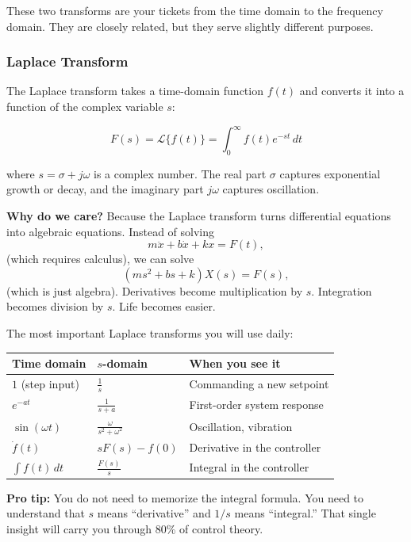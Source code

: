 These two transforms are your tickets from the time domain to the frequency domain. They are closely related, but they serve slightly different purposes.

\subsubsection{Laplace Transform}

The Laplace transform takes a time-domain function $f(t)$ and converts it into a function of the complex variable $s$:

\begin{equation}
F(s) = \mathcal{L}\{f(t)\} = \int_0^{\infty} f(t) e^{-st} \, dt
\end{equation}

where $s = \sigma + j\omega$ is a complex number. The real part $\sigma$ captures exponential growth or decay, and the imaginary part $j\omega$ captures oscillation.

\textbf{Why do we care?} Because the Laplace transform turns differential equations into algebraic equations. Instead of solving
\[
m\ddot{x} + b\dot{x} + kx = F(t),
\]
(which requires calculus), we can solve
\[
(ms^2 + bs + k)X(s) = F(s),
\]
(which is just algebra). Derivatives become multiplication by $s$. Integration becomes division by $s$. Life becomes easier.

The most important Laplace transforms you will use daily:

\begin{center}
\begin{tabular}{lll}
\toprule
\textbf{Time domain} & \textbf{$s$-domain} & \textbf{When you see it} \\
\midrule
$1$ (step input) & $\frac{1}{s}$ & Commanding a new setpoint \\
$e^{-at}$ & $\frac{1}{s+a}$ & First-order system response \\
$\sin(\omega t)$ & $\frac{\omega}{s^2 + \omega^2}$ & Oscillation, vibration \\
$\dot{f}(t)$ & $sF(s) - f(0)$ & Derivative in the controller \\
$\int f(t)\,dt$ & $\frac{F(s)}{s}$ & Integral in the controller \\
\bottomrule
\end{tabular}
\end{center}

\textbf{Pro tip:} You do not need to memorize the integral formula. You need to understand that $s$ means ``derivative'' and $1/s$ means ``integral.'' That single insight will carry you through 80\% of control theory.

